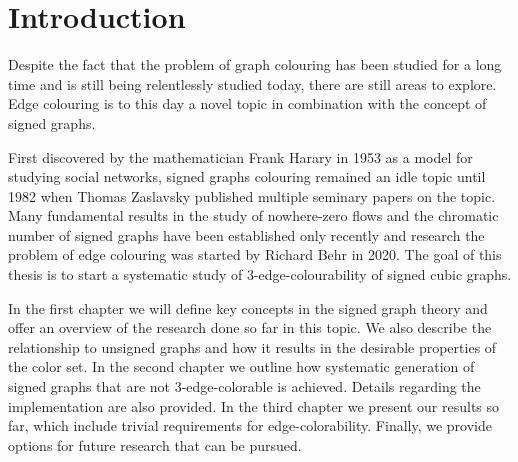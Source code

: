 \chapter*{Introduction}

Despite the fact that the problem of graph colouring has been studied for a long time and is still being relentlessly studied today, there are still areas to explore. Edge colouring is to this day a novel topic in combination with the concept of signed graphs.

First discovered by the mathematician Frank Harary in 1953 as a model for studying social networks, signed graphs colouring remained an idle topic until 1982 when Thomas Zaslavsky published multiple seminary papers on the topic. Many fundamental results in the study of nowhere-zero flows and the chromatic number of signed graphs have been established only recently and research the problem of edge colouring was started by Richard Behr in 2020. The goal of this thesis is to start a systematic study of 3-edge-colourability of signed cubic graphs.

In the first chapter we will define key concepts in the signed graph theory and offer an overview of the research done so far in this topic. We also describe the relationship to unsigned graphs and how it results in the desirable properties of the color set. In the second chapter we outline how systematic generation of signed graphs that are not 3-edge-colorable is achieved. Details regarding the implementation are also provided. In the third chapter we present our results so far, which include trivial requirements for edge-colorability. Finally, we provide options for future research that can be pursued.
